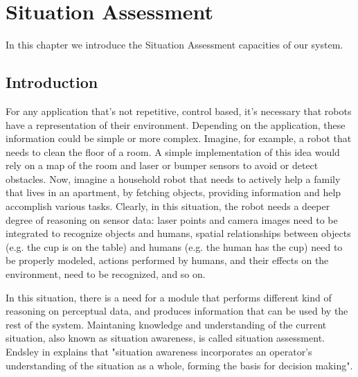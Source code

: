 
\chapter{Situation Assessment} %

\label{chapter-situation_assessment} %


In this chapter we introduce the Situation Assessment capacities of our system. 

\section{Introduction}
\label{situation_assessment-intro}
For any application that's not repetitive, control based, it's necessary that robots have a representation of their environment. Depending on the application, these information could be simple or more complex. Imagine, for example, a robot that needs to clean the floor of a room. A simple implementation of this idea would rely on a map of the room and laser or bumper sensors to avoid or detect obstacles. Now, imagine a household robot that needs to actively help a family that lives in an apartment, by fetching objects, providing information and help accomplish various tasks. Clearly, in this situation, the robot needs a deeper degree of reasoning on sensor data: laser points and camera images need to be integrated to recognize objects and humans, spatial relationships between objects (e.g. the cup is on the table) and humans (e.g. the human has the cup) need to be properly modeled, actions performed by humans, and their effects on the environment, need to be recognized, and so on.

In this situation, there is a need for a module that performs different kind of reasoning on perceptual data, and produces information that can be used by the rest of the system. Maintaning knowledge and understanding of the current situation, also known as situation awareness, is called situation assessment. 
Endsley in \cite{endsley1995} explains that "situation awareness incorporates an operator's understanding of the situation as a whole, forming the basis for decision making".


